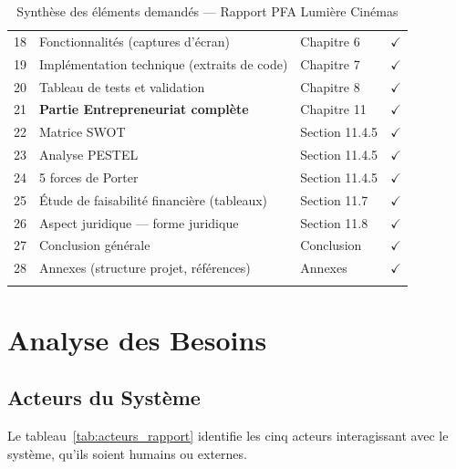 \documentclass[12pt,a4paper,openany]{report}
\begin{document}
\begin{longtable}{clp{4.8cm}c}
  18 & Fonctionnalités (captures d'écran)             & Chapitre 6                  & $\checkmark$ \\
  19 & Implémentation technique (extraits de code)    & Chapitre 7                  & $\checkmark$ \\
  20 & Tableau de tests et validation                 & Chapitre 8                  & $\checkmark$ \\
  21 & \textbf{Partie Entrepreneuriat complète}       & Chapitre 11                 & $\checkmark$ \\
  22 & Matrice SWOT                                   & Section 11.4.5              & $\checkmark$ \\
  23 & Analyse PESTEL                                 & Section 11.4.5              & $\checkmark$ \\
  24 & 5 forces de Porter                             & Section 11.4.5              & $\checkmark$ \\
  25 & Étude de faisabilité financière (tableaux)     & Section 11.7                & $\checkmark$ \\
  26 & Aspect juridique — forme juridique             & Section 11.8                & $\checkmark$ \\
  27 & Conclusion générale                            & Conclusion                  & $\checkmark$ \\
  28 & Annexes (structure projet, références)         & Annexes                     & $\checkmark$ \\
\caption{Synthèse des éléments demandés — Rapport PFA Lumière Cinémas}
\label{tab:synthese}
\end{longtable}

\chapter{Analyse des Besoins}

\section{Acteurs du Système}

Le tableau~\ref{tab:acteurs_rapport} identifie les cinq acteurs interagissant avec le système, qu'ils soient humains ou externes.
\end{document}
